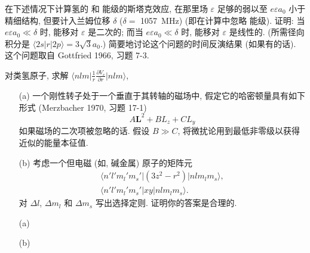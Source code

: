 \documentclass{assignment}
\begin{document}
\begin{prob}[课本习题 5.13]
    在下述情况下计算氢的  和  能级的斯塔克效应, 在那里场 $\varepsilon$ 足够的弱以至 $e\varepsilon a_0$ 小于精细结构, 但要计入兰姆位移 $\delta$ ($\delta=$ \SI{1057}{MHz}) (即在计算中忽略  能级). 证明: 当 $e\varepsilon a_0\ll\delta$ 时, 能移对 $\varepsilon$ 是二次的; 而当 $e\varepsilon a_0\ll\delta$ 时, 能移对 $\varepsilon$ 是线性的. (所需径向积分是 $\langle 2s\rvert r\lvert 2p\rangle=3\sqrt{3}a_0$.) 简要地讨论这个问题的时间反演结果 (如果有的话). 这个问题取自 Gottfried 1966, 习题 7-3.
\end{prob}
\begin{sol}
    
\end{sol}

\begin{prob}[补充习题]
    对类氢原子, 求解 $\langle nlm\rvert\frac{1}{r}\frac{\partial V_c}{\partial r}\lvert nlm\rangle$,
\end{prob}
\begin{sol}
    
\end{sol}

\begin{prob}[课本习题 5.17]
    \begin{itemize}
        \item[(a)] 一个刚性转子处于一个垂直于其转轴的磁场中, 假定它的哈密顿量具有如下形式 (Merzbacher 1970, 习题 17-1)
        \[
            A\bm{L}^2+BL_z+CL_y
        \]
        如果磁场的二次项被忽略的话. 假设 $B\gg C$, 将微扰论用到最低非零级以获得近似的能量本征值.
        \item[(b)] 考虑一个但电磁 (如, 碱金属) 原子的矩阵元
        \begin{gather*}
            \langle n'l'm_l'm_s'\rvert(3z^2-r^2)\lvert nlm_lm_s\rangle,\\
            \langle n'l'm_l'm_s'\rvert xy\lvert nlm_lm_s\rangle.
        \end{gather*}
        对 $\Delta l$, $\Delta m_l$ 和 $\Delta m_s$ 写出选择定则. 证明你的答案是合理的.
    \end{itemize}
\end{prob}
\begin{sol}
    \begin{itemize}
        \item[(a)] 
        \item[(b)] 
    \end{itemize}
\end{sol}
\end{document}
